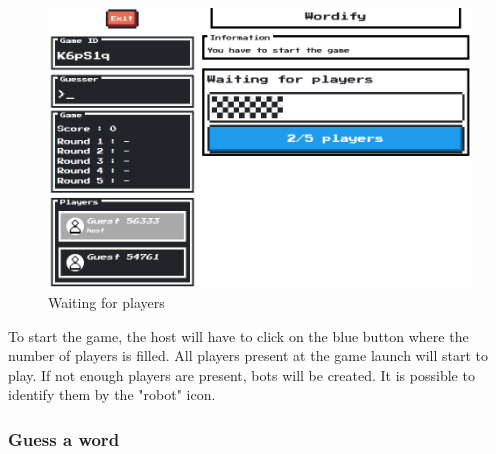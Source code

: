 \documentclass{tnreport}
\begin{document}
\begin{figure}[ht]
	\centering
	\fboxsep=1.2pt
	\includegraphics[scale=0.53]{figures/waiting_players}
	\caption{Waiting for players}
	\label{fig:waiting_players}
\end{figure} 

To start the game, the host will have to click on the blue button where the number of players is filled. All players present at the game launch will start to play. If not enough players are present, bots will be created. It is possible to identify them by the "robot" icon. 

\subsubsection{Guess a word}
\end{document}
